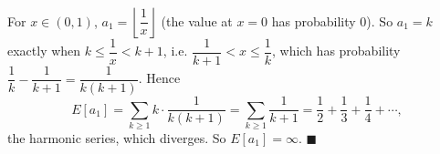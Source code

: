 For $x\in(0,1)$, $a_1=\left\lfloor\dfrac1x\right\rfloor$ (the value at $x=0$ has probability $0$). So $a_1=k$ exactly when $k\le\dfrac1x<k+1$, i.e. $\dfrac1{k+1}<x\le\dfrac1k$, which has probability $\dfrac1k-\dfrac1{k+1}=\dfrac1{k(k+1)}$. Hence
\[E[a_1]=\sum_{k\ge1}k\cdot\dfrac1{k(k+1)}=\sum_{k\ge1}\dfrac1{k+1}=\dfrac12+\dfrac13+\dfrac14+\cdots,\]
the harmonic series, which diverges. So $E[a_1]=\boxed{\infty}$. $\blacksquare$
